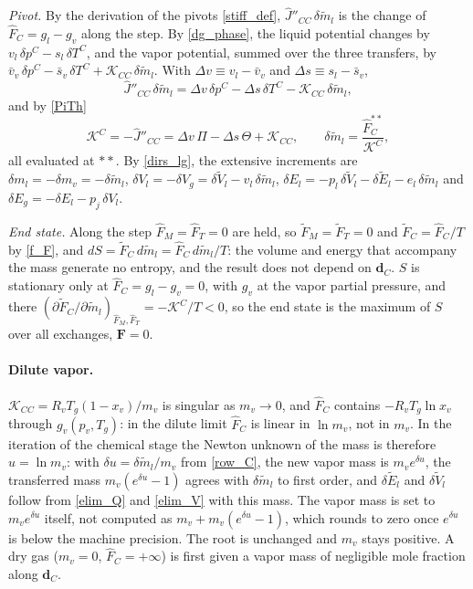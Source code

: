 \emph{Pivot.} By the derivation of the pivots \eqref{stiff_def}, $\hat{J}''_{CC}\,\delta\tilde{m}_l$ is the change of $\hat{F}_C=g_l-g_v$ along the step. By \eqref{dg_phase}, the liquid potential changes by $v_l\,\delta p^C-s_l\,\delta T^C$, and the vapor potential, summed over the three transfers, by $\bar v_v\,\delta p^C-\bar s_v\,\delta T^C+\mathcal{K}_{CC}\,\delta\tilde{m}_l$. With $\Delta v\equiv v_l-\bar v_v$ and $\Delta s\equiv s_l-\bar s_v$,
\begin{equation}
\hat{J}''_{CC}\,\delta\tilde{m}_l=\Delta v\,\delta p^C-\Delta s\,\delta T^C-\mathcal{K}_{CC}\,\delta\tilde{m}_l,
\end{equation}
and by \eqref{PiTh}
\begin{equation}\label{K_C}
\mathcal{K}^C=-\hat{J}''_{CC}=\Delta v\,\Pi-\Delta s\,\Theta+\mathcal{K}_{CC},\qquad \delta\tilde{m}_l=\frac{\hat{F}_C^{**}}{\mathcal{K}^C},
\end{equation}
all evaluated at $**$. By \eqref{dirs_lg}, the extensive increments are $\delta m_l=-\delta m_v=-\delta\tilde{m}_l$, $\delta V_l=-\delta V_g=\delta\tilde{V}_l-v_l\,\delta\tilde{m}_l$, $\delta E_l=-p_l\,\delta\tilde{V}_l-\delta\tilde{E}_l-e_l\,\delta\tilde{m}_l$ and $\delta E_g=-\delta E_l-p_{j}\,\delta V_l$.

\emph{End state.} Along the step $\hat{F}_M=\hat{F}_T=0$ are held, so $\tilde{F}_M=\tilde{F}_T=0$ and $\tilde{F}_C=\hat{F}_C/T$ by \eqref{f_F}, and $dS=\tilde{F}_C\,d\tilde{m}_l=\hat{F}_C\,d\tilde{m}_l/T$: the volume and energy that accompany the mass generate no entropy, and the result does not depend on $\boldsymbol{d}_C$. $S$ is stationary only at $\hat{F}_C=g_l-g_v=0$, with $g_v$ at the vapor partial pressure, and there $(\partial\tilde{F}_C/\partial\tilde{m}_l)_{\hat{F}_M,\hat{F}_T}=-\mathcal{K}^C/T<0$, so the end state is the maximum of $S$ over all exchanges, $\boldsymbol{F}=0$.

\paragraph{Dilute vapor.}
$\mathcal{K}_{CC}=R_vT_g(1-x_v)/m_v$ is singular as $m_v\to0$, and $\hat{F}_C$ contains $-R_vT_g\ln x_v$ through $g_v(p_v,T_g)$: in the dilute limit $\hat{F}_C$ is linear in $\ln m_v$, not in $m_v$. In the iteration of the chemical stage the Newton unknown of the mass is therefore $u=\ln m_v$: with $\delta u=\delta\tilde{m}_l/m_v$ from \eqref{row_C}, the new vapor mass is $m_ve^{\delta u}$, the transferred mass $m_v(e^{\delta u}-1)$ agrees with $\delta\tilde{m}_l$ to first order, and $\delta\tilde{E}_l$ and $\delta\tilde{V}_l$ follow from \eqref{elim_Q} and \eqref{elim_V} with this mass. The vapor mass is set to $m_ve^{\delta u}$ itself, not computed as $m_v+m_v(e^{\delta u}-1)$, which rounds to zero once $e^{\delta u}$ is below the machine precision. The root is unchanged and $m_v$ stays positive. A dry gas ($m_v=0$, $\hat{F}_C=+\infty$) is first given a vapor mass of negligible mole fraction along $\boldsymbol{d}_C$.


